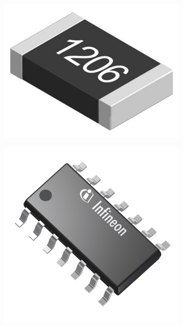 \begin{figure}[h]
    \centering
    \begin{subfigure}
        \centering
        \includegraphics[scale=0.4]{Imagenes/1206.jpg}
    \end{subfigure}
    \hspace{1em}
    \begin{subfigure}
        \centering
        \includegraphics[scale=0.05]{Imagenes/Driver DSO-14.png}

\end{subfigure}
\end{figure}
